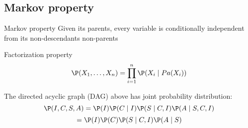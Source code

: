 \subsection{Markov property}
	\begin{frame}
		\begin{block}{Markov property}
			Given its parents, every variable is conditionally independent from its non-descendants non-parents
		\end{block}
		\begin{block}{Factorization property}
			\[ \P( X_1 , \ldots , X_n ) = \prod_{i=1}^n \P( X_i \mid {Pa}( X_i ) ) \]
		\end{block}
	\end{frame}
	
	\begin{frame}[fragile]
		\begin{figure}
	 		\centering
			
		\end{figure}
		\begin{block}{}
			The directed acyclic graph (DAG) above has joint probability distribution:
			\[ \P( I , C , S , A ) = \P( I ) \P( C \mid I ) \P( S \mid C , I ) \P( A \mid S , C , I ) \]
			\[ = \P( I ) \P( C ) \P( S \mid C , I ) \P( A \mid S ) \]
		\end{block}
	\end{frame}